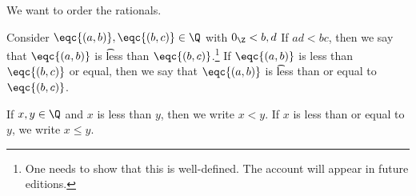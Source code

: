 

We want to order the rationals.


Consider $\eqc{(a, b)}, \eqc{(b, c)} \in \Q$ with $0_{\Z} < b, d$
If $ad < bc$, then we say that $\eqc{(a, b)}$ is \t{less than} $\eqc{(b, c)}$.\footnote{One needs to show that this is well-defined. The account will appear in future editions.}
If $\eqc{(a, b)}$ is less than $\eqc{(b, c)}$ or equal, then we say that $\eqc{(a, b)}$ is \t{less than or equal to} $\eqc{(b, c)}$.


If $x, y \in \Q$ and $x$ is less than $y$, then we write $x < y$.
If $x$ is less than or equal to $y$, we write $x \leq y$.

\blankpage
